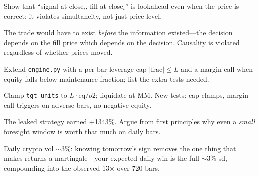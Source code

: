 \begin{exercise}[hard]
Show that ``signal at close$_i$, fill at close$_i$'' is lookahead even when the price is
correct: it violates simultaneity, not just price level.
\end{exercise}
\begin{solution}
The trade would have to exist \emph{before} the information existed---the decision depends
on the fill price which depends on the decision. Causality is violated regardless of
whether prices moved.
\end{solution}

\begin{exercise}[hard]
Extend \texttt{engine.py} with a per-bar leverage cap $\lvert\text{frac}\rvert\le L$ and a
margin call when equity falls below maintenance fraction; list the extra tests needed.
\end{exercise}
\begin{solution}
Clamp \texttt{tgt\_units} to $L\cdot\text{eq}/o2$; liquidate at MM. New tests: cap clamps,
margin call triggers on adverse bars, no negative equity.
\end{solution}

\begin{exercise}[hard]
The leaked strategy earned +1343\%. Argue from first principles why even a \emph{small}
foresight window is worth that much on daily bars.
\end{exercise}
\begin{solution}
Daily crypto vol $\sim3\%$: knowing tomorrow's sign removes the one thing that makes
returns a martingale---your expected daily win is the full $\sim$3\% sd, compounding into
the observed 13$\times$ over 720 bars.
\end{solution}

